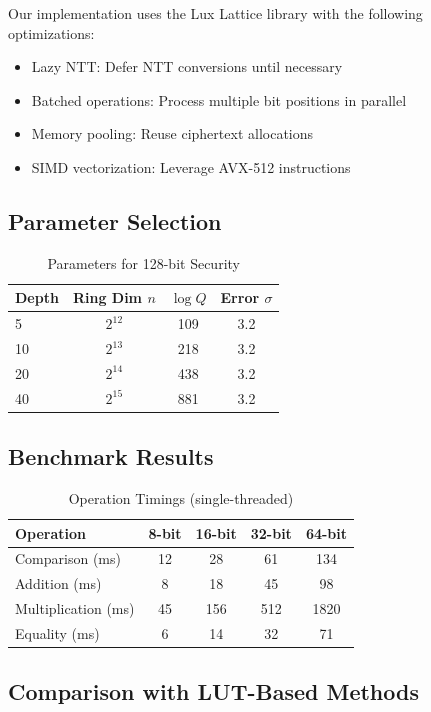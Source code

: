 \documentclass[11pt,a4paper]{article}
\begin{document}
Our implementation uses the Lux Lattice library with the following optimizations:
\begin{itemize}
    \item Lazy NTT: Defer NTT conversions until necessary
    \item Batched operations: Process multiple bit positions in parallel
    \item Memory pooling: Reuse ciphertext allocations
    \item SIMD vectorization: Leverage AVX-512 instructions
\end{itemize}

\subsection{Parameter Selection}

\begin{table}[h]
\centering
\caption{Parameters for 128-bit Security}
\begin{tabular}{@{}lccc@{}}
\toprule
Depth & Ring Dim $n$ & $\log Q$ & Error $\sigma$ \\
\midrule
5 & $2^{12}$ & 109 & 3.2 \\
10 & $2^{13}$ & 218 & 3.2 \\
20 & $2^{14}$ & 438 & 3.2 \\
40 & $2^{15}$ & 881 & 3.2 \\
\bottomrule
\end{tabular}
\end{table}

\subsection{Benchmark Results}

\begin{table}[h]
\centering
\caption{Operation Timings (single-threaded)}
\begin{tabular}{@{}lcccc@{}}
\toprule
Operation & 8-bit & 16-bit & 32-bit & 64-bit \\
\midrule
Comparison (ms) & 12 & 28 & 61 & 134 \\
Addition (ms) & 8 & 18 & 45 & 98 \\
Multiplication (ms) & 45 & 156 & 512 & 1820 \\
Equality (ms) & 6 & 14 & 32 & 71 \\
\bottomrule
\end{tabular}
\end{table}

\subsection{Comparison with LUT-Based Methods}
\end{document}
